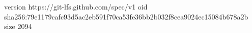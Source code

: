 version https://git-lfs.github.com/spec/v1
oid sha256:79e1179cafc93d5ac2eb591f70ca53fe36bb2b032f8cea9024ec15084b678a2b
size 2094
